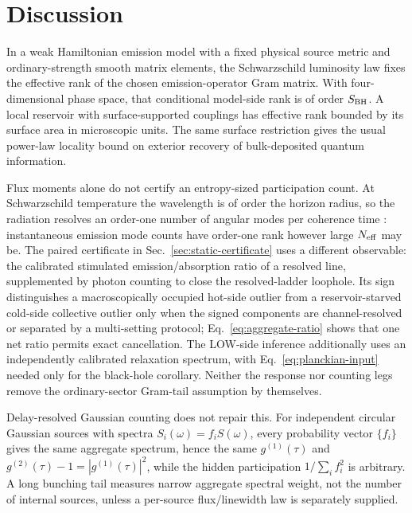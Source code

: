 \documentclass[12pt]{article}
\newcommand{\Neff}{N_{\rm eff}}
\begin{document}
\section{Discussion}

In a weak Hamiltonian emission model with a fixed physical source metric and
ordinary-strength smooth matrix elements, the Schwarzschild luminosity law
fixes the effective rank of the chosen emission-operator Gram matrix.  With
four-dimensional phase space, that conditional model-side rank is of order
$S_{\rm BH}$.  A local reservoir with
surface-supported couplings has effective rank bounded by its surface
area in microscopic units.  The same surface restriction gives the
usual power-law locality bound on exterior recovery of bulk-deposited
quantum information.

Flux moments alone do not certify an entropy-sized participation
count.  At Schwarzschild temperature the wavelength is of order the
horizon radius, so the radiation resolves an order-one number of
angular modes per coherence time
\cite{Page1976,BekensteinMayo2001,Pendry1983}: instantaneous emission
mode counts have order-one rank however large $\Neff$ may be.  The
paired certificate in Sec.~\ref{sec:static-certificate} uses a
different observable: the calibrated stimulated emission/absorption
ratio of a resolved line, supplemented by photon counting to close the
resolved-ladder loophole.  Its sign distinguishes a macroscopically
occupied hot-side outlier from a reservoir-starved cold-side collective
outlier only when the signed components are channel-resolved or
separated by a multi-setting protocol; Eq.~\eqref{eq:aggregate-ratio}
shows that one net ratio permits exact cancellation.  The LOW-side
inference additionally uses an independently calibrated relaxation
spectrum, with Eq.~\eqref{eq:planckian-input} needed only for the
black-hole corollary.  Neither the response nor counting legs remove the
ordinary-sector Gram-tail assumption by themselves.

Delay-resolved Gaussian counting does not repair this.  For independent
circular Gaussian sources with spectra $S_i(\omega)=f_iS(\omega)$, every
probability vector $\{f_i\}$ gives the same aggregate spectrum, hence the same
$g^{(1)}(\tau)$ and
$g^{(2)}(\tau)-1=|g^{(1)}(\tau)|^2$, while the hidden participation
$1/\sum_i f_i^2$ is arbitrary.  A long bunching tail measures narrow
aggregate spectral weight, not the number of internal sources, unless a
per-source flux/linewidth law is separately supplied.
\end{document}
